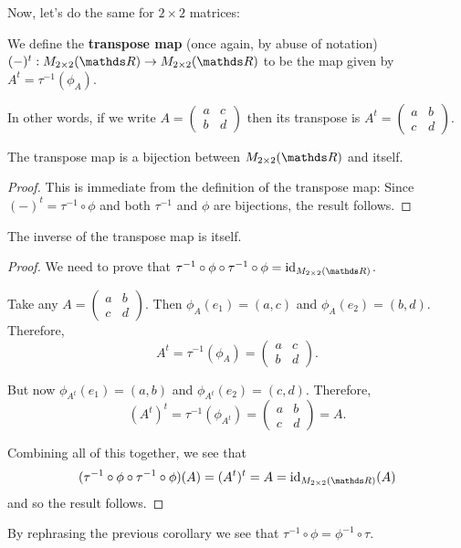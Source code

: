 Now, let's do the same for $2\times 2$ matrices:

\begin{df}
	We define the \textbf{transpose map} (once again, by abuse of notation) $(-)^t:M_{2\times 2}(\R)\to M_{2\times 2}(\R)$ to be the map given by $A^t=\tau^{-1}(\phi_A)$.
	
	In other words, if we write $A=\begin{pmatrix}
	a&c\\b&d
	\end{pmatrix}$ then its transpose is $A^t=\begin{pmatrix}
	a&b\\c&d
	\end{pmatrix}$.
\end{df}
\begin{prop}
	The transpose map is a bijection between $M_{2\times2}(\R)$ and itself.
\end{prop}
\begin{proof}
	This is immediate from the definition of the transpose map: Since $(-)^t=\tau^{-1}\circ \phi$ and both $\tau^{-1}$ and $\phi$ are bijections, the result follows.
\end{proof}
\begin{cor}
	The inverse of the transpose map is itself.
\end{cor}
\begin{proof}
	We need to prove that $\tau^{-1}\circ \phi\circ\tau^{-1}\circ\phi=\id_{M_{2\times 2}(\R)}$.
	
	Take any $A=\begin{pmatrix}
	a&b\\c&d
	\end{pmatrix}$. Then $\phi_A(e_1)=(a,c)$ and $\phi_A(e_2)=(b,d)$. Therefore, $$A^t=\tau^{-1}(\phi_A)=\begin{pmatrix}
	a&c\\b&d
	\end{pmatrix}.$$
	
	But now $\phi_{A^t}(e_1)=(a,b)$ and $\phi_{A^t}(e_2)=(c,d)$. Therefore, $$(A^t)^t=\tau^{-1}(\phi_{A^t})=\begin{pmatrix}
	a&b\\c&d
	\end{pmatrix}=A.$$
	
	Combining all of this together, we see that $$(\tau^{-1}\circ \phi\circ\tau^{-1}\circ\phi)(A)=(A^t)^t=A=\id_{M_{2\times 2}(\R)}(A)$$ and so the result follows.
\end{proof}
\begin{cor}
	By rephrasing the previous corollary we see that $\tau^{-1}\circ\phi=\phi^{-1}\circ\tau$.
\end{cor}


